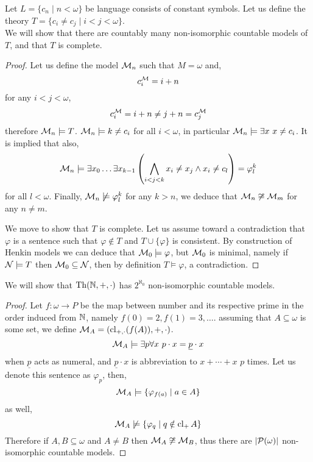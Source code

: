 \question{}
Let $L = \{ c_n \mid n < \omega \}$ be language consists of constant symbols.
Let us define the theory $T = \{ c_i \ne c_j \mid i < j < \omega \}$. \\
We will show that there are countably many non-isomorphic countable models of $T$, and that $T$ is complete.
\begin{proof}
	Let us define the model $\mathcal{M}_n$ such that $M = \omega$ and,
	\[
		c_i^{\mathcal{M}} = i + n
	\]
	for any $i < j < \omega$,
	\[
		c_i^{\mathcal{M}}
		= i + n
		\ne j + n
		= c_j^{\mathcal{M}}
	\]
	therefore $\mathcal{M}_n \models T$.
	$\mathcal{M}_n \models k \ne c_i$ for all $i < \omega$, in particular $\mathcal{M}_n \models \exists x\ x \ne c_i$.
	It is implied that also,
	\[
		\mathcal{M}_n
		\models \exists x_0 \ldots \exists x_{k - 1} \left( \bigwedge_{i < j < k} x_i \ne x_j \land x_i \ne c_l \right)
		= \varphi_l^k
	\]
	for all $l < \omega$.
	Finally, $\mathcal{M}_n \not\models \varphi_l^k$ for any $k > n$, we deduce that $\mathcal{M}_n \not\cong \mathcal{M}_m$ for any $n \ne m$.

	We move to show that $T$ is complete.
	Let us assume toward a contradiction that $\varphi$ is a sentence such that $\varphi \notin T$ and $T \cup \{ \varphi \}$ is consistent.
	By construction of Henkin models we can deduce that $\mathcal{M}_0 \models \varphi$, but $\mathcal{M}_0$ is minimal, namely if $\mathcal{N} \models T$ then $\mathcal{M}_0 \subseteq \mathcal{N}$,
	then by definition $T \models \varphi$, a contradiction.
\end{proof}

\question{}
We will show that $\operatorname{Th}(\mathbb{N}, +, \cdot)$ has $2^{\aleph_0}$ non-isomorphic countable models.
\begin{proof}
	Let $f : \omega \to P$ be the map between number and its respective prime in the order induced from $\mathbb{N}$, namely $f(0) = 2, f(1) = 3, \ldots$.
	assuming that $A \subseteq \omega$ is some set, we define $\mathcal{M}_A = (\operatorname{cl}_{+, \cdot}(f(A)), +, \cdot)$.
	\[
		\mathcal{M}_A \models \exists p \forall x\ p \cdot x = \underline{p} \cdot x
	\]
	when $\underline{p}$ acts as numeral, and $\underline{p} \cdot x$ is abbreviation to $x + \cdots + x$ $p$ times.
	Let us denote this sentence as $\varphi_p$, then,
	\[
		\mathcal{M}_A \models \{ \varphi_{f(a)} \mid a \in A \}
	\]
	as well,
	\[
		\mathcal{M}_A \not\models \{ \varphi_q \mid q \notin \operatorname{cl}_+ A \}
	\]
	Therefore if $A, B \subseteq \omega$ and $A \ne B$ then $\mathcal{M}_A \not\cong \mathcal{M}_B$, thus there are $|\mathcal{P}(\omega)|$ non-isomorphic countable models.
\end{proof}

